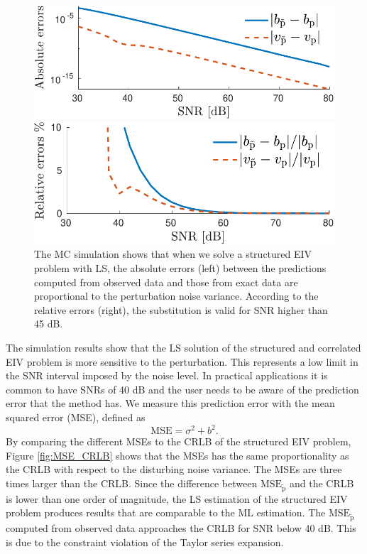 \begin{figure}[htb!]
    \centering
    \begin{minipage}{0.45\textwidth}
        \centering
        \includegraphics[width=1\textwidth]{./ChapterStatisticalAnalysis/fig/Fig_8l.pdf} 
    \end{minipage}
    \begin{minipage}{0.45\textwidth}
        \centering
        \includegraphics[width=1\textwidth]{./ChapterStatisticalAnalysis/fig/Fig_8r.pdf} 
    \end{minipage}
  \caption{ \label{fig:bv_btvt_abse_rele_str_e7} The MC simulation shows that when we solve a structured EIV problem with LS, the absolute errors (left) between the predictions computed from observed data and those from exact data are proportional to the perturbation noise variance. According to the relative errors (right), the substitution is valid for SNR higher than 45 dB. } 
\end{figure}

The simulation results show that the LS solution of the structured and correlated EIV problem is more sensitive to the perturbation.
This represents a low limit in the SNR interval imposed by the noise level.
In practical applications it is common to have SNRs of 40 dB and the user needs to be aware of the prediction error that the method has.
We measure this prediction error with the mean squared error (MSE), defined as
\begin{equation} \mathrm{MSE} = \sigma^2 + b^2. \end{equation}
 By comparing the different MSEs to the CRLB of the structured EIV problem,
Figure \ref{fig:MSE_CRLB} shows that the MSEs has the same proportionality as the CRLB with respect to the disturbing noise variance.
The MSEs are three times larger than the CRLB.
Since the difference between $\mathrm{MSE}_{\widetilde{\mathrm{p}}}$ and the CRLB is lower than one order of magnitude, 
the LS estimation of the structured EIV problem produces results that are comparable to the ML estimation.
The $\mathrm{MSE}_{\widetilde{\mathrm{p}}}$ computed from observed data approaches the CRLB for SNR below 40 dB.
This is due to the constraint violation of the Taylor series expansion.


